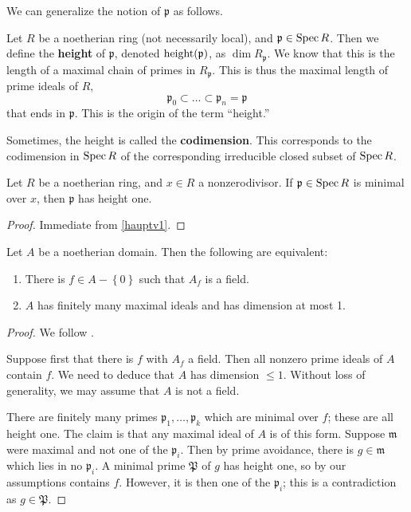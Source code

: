 We can generalize the notion of $\mathfrak{p}$ as follows.
\begin{definition} 
Let $R$ be a noetherian ring (not necessarily local), and $\mathfrak{p} \in
\operatorname{Spec} R$. Then we define the \textbf{height} of $\mathfrak{p}$, denoted
$\operatorname{height}(\mathfrak{p})$, as $\dim R_{\mathfrak{p}}$.
We know that this is the length of a maximal chain of primes in
$R_{\mathfrak{p}}$. This is thus the maximal length of prime ideals of $R$, 
\[ \mathfrak{p}_0 \subset \dots \subset \mathfrak{p}_n = \mathfrak{p}  \]
that ends in $\mathfrak{p}$. This is the origin of the term ``height.''
\end{definition} 

\begin{remark} 
Sometimes, the height is called the \textbf{codimension}. This corresponds to
the codimension in $\operatorname{Spec} R$ of the corresponding irreducible closed subset of
$\operatorname{Spec} R$.
\end{remark} 

\begin{theorem}  Let $R$ be a noetherian ring, and $x
\in R$ a nonzerodivisor. If $\mathfrak{p} \in \operatorname{Spec} R$ is minimal over $x$,
then $\mathfrak{p}$ has height one.
\end{theorem} 
\begin{proof} 
Immediate from \cref{hauptv1}.
\end{proof} 

\begin{theorem}
Let $A$ be a noetherian domain. Then the following are equivalent:
\begin{enumerate}
\item There is $f \in A-\left\{0\right\} $ such that $A_f$ is a field.
\item $A$ has finitely many maximal ideals and has dimension at most 1.
\end{enumerate}
\end{theorem} 
\begin{proof} We follow \cite{EGA}.

Suppose first that there is $f$ with $A_f$ a field. 
Then all nonzero prime ideals of $A$ contain $f$. 
We need to deduce that $A$ has dimension $\leq 1$. Without loss of generality,
we may assume that $A$ is not a field.

There are finitely many primes $\mathfrak{p}_1,\dots, \mathfrak{p}_k$ which
are minimal over $f$; these are all height one. The claim is that any maximal ideal of $A$ is of this
form. Suppose $\mathfrak{m}$ were maximal and not one of the $\mathfrak{p}_i$.
Then by prime avoidance, there is $g \in \mathfrak{m}$ which
lies in no $\mathfrak{p}_i$. A minimal prime $\mathfrak{P}$ of $g$ has height
one, so by our assumptions contains $f$. However, it is then one of the
$\mathfrak{p}_i$; this is a contradiction as $g \in \mathfrak{P}$.
\end{proof} 


